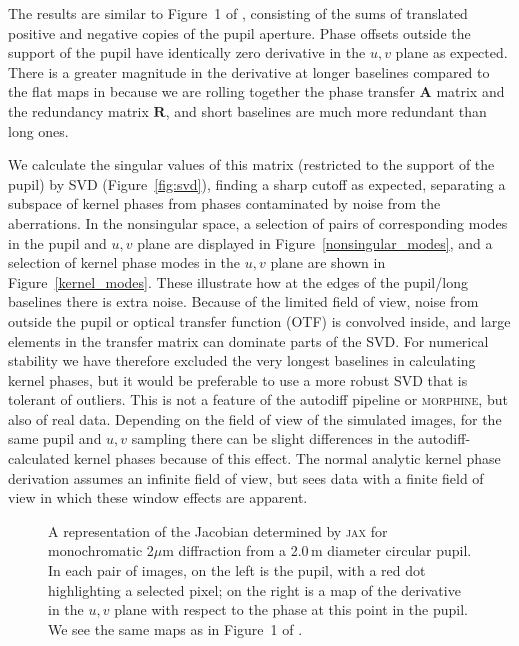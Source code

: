 \documentclass[modern]{aastex63}
\begin{document}
The results are similar to Figure~1 of \citet{martinache10}, consisting of the sums of translated positive and negative copies of the pupil aperture. Phase offsets outside the support of the pupil have identically zero derivative in the $u,v$ plane as expected. There is a greater magnitude in the derivative at longer baselines compared to the flat maps in \citet{martinache10} because we are rolling together the phase transfer $\mathbf{A}$ matrix and the redundancy matrix $\mathbf{R}$, and short baselines are much more redundant than long ones.

We calculate the singular values of this matrix (restricted to the support of the pupil) by SVD (Figure~\ref{fig:svd}), finding a sharp cutoff as expected, separating a subspace of kernel phases from phases contaminated by noise from the aberrations. In the nonsingular space, a selection of pairs of corresponding modes in the pupil and $u,v$ plane are displayed in Figure~\ref{nonsingular_modes}, and a selection of kernel phase modes in the $u,v$ plane are shown in Figure~\ref{kernel_modes}. These illustrate how at the edges of the pupil/long baselines there is extra noise. Because of the limited field of view, noise from outside the pupil or optical transfer function (OTF) is convolved inside, and large elements in the transfer matrix can dominate parts of the SVD. For numerical stability we have therefore excluded the very longest baselines in calculating kernel phases, but it would be preferable to use a more robust SVD that is tolerant of outliers. This is not a feature of the autodiff pipeline or \textsc{morphine}, but also of real data. Depending on the field of view of the simulated images, for the same pupil and $u,v$ sampling there can be slight differences in the autodiff-calculated kernel phases because of this effect. The normal analytic kernel phase derivation assumes an infinite field of view, but sees data with a finite field of view in which these window effects are apparent. %

\begin{figure}
\caption{A representation of the Jacobian determined by \textsc{jax} for monochromatic 2$\mu$m diffraction from a 2.0\,m diameter circular pupil. In each pair of images, on the left is the pupil, with a red dot highlighting a selected pixel; on the right is a map of the derivative in the $u,v$ plane with respect to the phase at this point in the pupil. We see the same maps as in Figure~1 of \citet{martinache10}. \label{kernel_jacobian}}
\end{figure}
\end{document}
